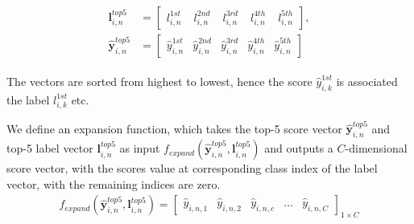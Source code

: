 \begin{align}
\begin{split}
\mathbf{l}_{i,n}^{top5} &= \begin{bmatrix}
l_{i,n}^{1st} & \phantom{.}l_{i,n}^{2nd} & \phantom{.}l_{i,n}^{3rd} & \phantom{.}l_{i,n}^{4th} & \phantom{.}l_{i,n}^{5th}
\end{bmatrix}, \\
\mathbf{\hat{y}}^{top5}_{i,n} &= \begin{bmatrix}
\hat{y}_{i,n}^{1st} & \hat{y}_{i,n}^{2nd} & \hat{y}_{i,n}^{3rd} & \hat{y}_{i,n}^{4th} & \hat{y}_{i,n}^{5th}
\end{bmatrix}
\end{split}
\end{align}

The vectors are sorted from highest to lowest, hence the score $ \hat{y}_{i,k}^{1st} $ is associated the label $ l_{i,k}^{1st} $ etc. 

We define an expansion function, which takes the top-5 score vector $ \mathbf{\hat{y}}_{i,n}^{top5}$ and top-5 label vector  $\mathbf{l}_{i,n}^{top5}$ as input  $ f_{expand}\left(\bm{\hat{y}}_{i,n}^{top5},\mathbf{l}_{i,n}^{top5}\right) $ and outputs a $ C $-dimensional score vector, with the scores value at corresponding class index of the label vector, with the remaining indices are zero.
\begin{align}
f_{expand}\left(\bm{\hat{y}}_{i,n}^{top5},\mathbf{l}_{i,n}^{top5}\right) = 
\begin{bmatrix}
\hat{y}_{i,n,1} & \hat{y}_{i,n,2} & \hat{y}_{i,n,c} & \dots & \hat{y}_{i,n,C}
\end{bmatrix}_{1 \times C}
\end{align}

